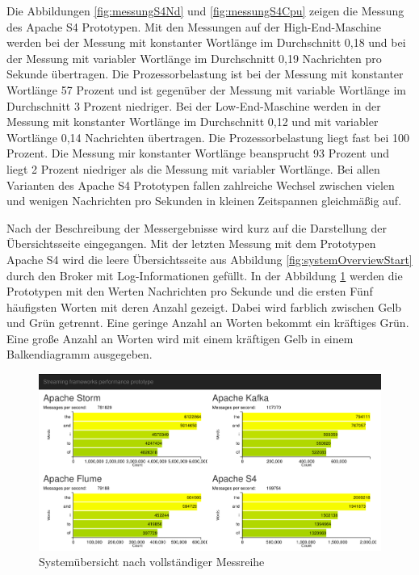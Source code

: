 Die Abbildungen \ref{fig:messungS4Nd} und \ref{fig:messungS4Cpu} zeigen die Messung des Apache S4 Prototypen. Mit den Messungen auf der High-End-Maschine werden bei der Messung mit konstanter Wortlänge im Durchschnitt 0,18 und bei der Messung mit variabler Wortlänge im Durchschnitt 0,19 Nachrichten pro Sekunde übertragen. Die Prozessorbelastung ist bei der Messung mit konstanter Wortlänge 57 Prozent und ist gegenüber der Messung mit variable Wortlänge im Durchschnitt 3 Prozent niedriger. Bei der Low-End-Maschine werden in der Messung mit konstanter Wortlänge im Durchschnitt 0,12 und mit variabler Wortlänge 0,14 Nachrichten übertragen. Die Prozessorbelastung liegt fast bei 100 Prozent. Die Messung mir konstanter Wortlänge beansprucht 93 Prozent und liegt 2 Prozent niedriger als die Messung mit variabler Wortlänge. Bei allen Varianten des Apache S4 Prototypen fallen zahlreiche Wechsel zwischen vielen und wenigen Nachrichten pro Sekunden in kleinen Zeitspannen gleichmäßig auf.

Nach der Beschreibung der Messergebnisse wird kurz auf die Darstellung der Übersichtsseite eingegangen. Mit der letzten Messung mit dem Prototypen Apache S4 wird die leere Übersichtsseite aus Abbildung \ref{fig:systemOverviewStart} durch den Broker mit Log-Informationen gefüllt. In der Abbildung \ref{fig:prototypeStreamingGraph} werden die Prototypen mit den Werten Nachrichten pro Sekunde und die ersten Fünf häufigsten Worten mit deren Anzahl gezeigt. Dabei wird farblich zwischen Gelb und Grün getrennt. Eine geringe Anzahl an Worten bekommt ein kräftiges Grün. Eine große Anzahl an Worten wird mit einem kräftigen Gelb in einem Balkendiagramm ausgegeben.


\begin{figure}[!ht]
\centering
\includegraphics[width=1.0\textwidth]{bilder/PrototypeStreamingGraph.png}
\caption{Systemübersicht nach vollständiger Messreihe
\label{fig:prototypeStreamingGraph}}
\end{figure}


